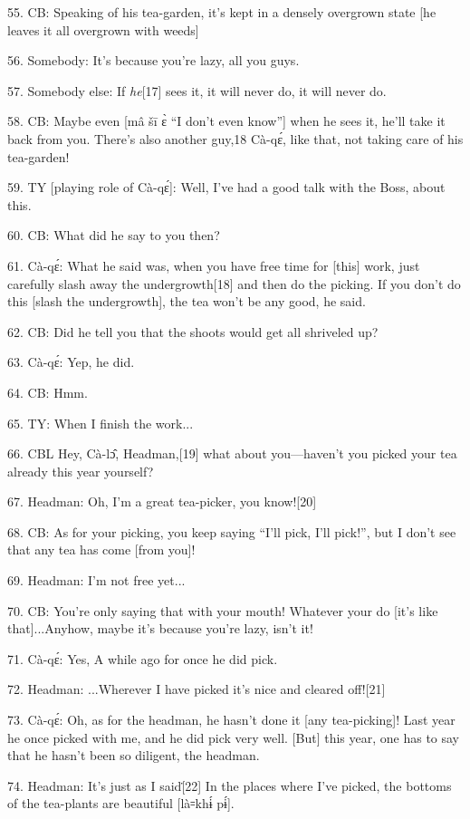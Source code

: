 55. CB: Speaking of his tea-garden, it's kept in a densely overgrown state [he
leaves it all overgrown with weeds]

56. Somebody: It's because you're lazy, all you guys.

57. Somebody else: If \textit{he}[17] sees it, it will never do, it will never
do.

58. CB: Maybe even [mâ šī ɛ̀ ``I don't even know''] when he sees it, he'll
take it back from you.  There's also another guy,18 Cà-qɛ́,\textit{ }like that,
not taking care of his tea-garden!

59. TY [playing role of Cà-qɛ́]: Well, I've had a good talk with the Boss, about
this.

60. CB: What did he say to you then?

61. Cà-qɛ́: What he said was, when you have free time for [this] work, just
carefully slash away the undergrowth[18] and then do the picking.  If you don't
do this [slash the undergrowth], the tea won't be any good, he said.

62. CB: Did he tell you that the shoots would get all shriveled up?

63. Cà-qɛ́: Yep, he did.

64. CB: Hmm.

65. TY: When I finish the work...

66. CBL Hey, Cà-lɔ̂, Headman,[19] what about you---haven't you picked your tea
already this year yourself?

67. Headman: Oh, I'm a great tea-picker, you know![20]

68. CB: As for your picking, you keep saying ``I'll pick, I'll pick!'', but I don't
see that any tea has come [from you]!

69. Headman: I'm not free yet...

70. CB: You're only saying that with your mouth! Whatever your do [it's like that]...Anyhow,
maybe it's because you're lazy, isn't it!

71. Cà-qɛ́: Yes, A while ago for once he did pick.

72. Headman: ...Wherever I have picked it's nice and cleared off![21]

73. Cà-qɛ́: Oh, as for the headman, he hasn't done it [any tea-picking]!  Last
year he once picked with me, and he did pick very well.  [But] this year, one has
to say that he hasn't been so diligent, the headman.

74. Headman: It's just as I said\.[22]  In the places where I've picked, the bottoms
of the tea-plants are beautiful [là꞊khɨ́ pɨ́].

